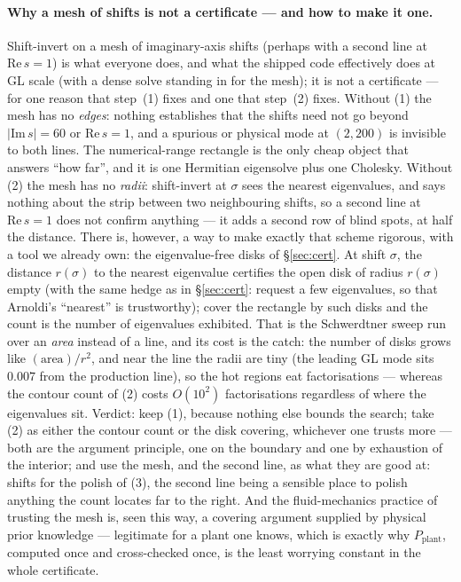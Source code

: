 \documentclass[11pt,a4paper]{article}
\begin{document}
{\paragraph{Why a mesh of shifts is not a certificate --- and how to make it one.}
Shift-invert on a mesh of imaginary-axis shifts (perhaps with a second line at
$\mathrm{Re}\,s=1$) is what everyone does, and what the shipped code effectively does at
GL scale (with a dense solve standing in for the mesh); it is not a certificate --- for
one reason that step~(1) fixes and one that step~(2) fixes.  Without (1) the mesh has no
\emph{edges}: nothing establishes that the shifts need not go beyond $|\mathrm{Im}\,s|=60$
or $\mathrm{Re}\,s=1$, and a spurious or physical mode at $(2,200)$ is invisible to both
lines.  The numerical-range rectangle is the only cheap object that answers ``how far'',
and it is one Hermitian eigensolve plus one Cholesky.  Without (2) the mesh has no
\emph{radii}: shift-invert at $\sigma$ sees the nearest eigenvalues, and says nothing
about the strip between two neighbouring shifts, so a second line at $\mathrm{Re}\,s=1$
does not confirm anything --- it adds a second row of blind spots, at half the distance.
There is, however, a way to make exactly that scheme rigorous, with a tool we already
own: the eigenvalue-free disks of \S\ref{sec:cert}.  At shift $\sigma$, the
distance $r(\sigma)$ to the nearest eigenvalue certifies the open disk of radius
$r(\sigma)$ empty (with the same hedge as in \S\ref{sec:cert}: request a few
eigenvalues, so that Arnoldi's ``nearest'' is trustworthy); cover the rectangle by such
disks and the count is the number of eigenvalues exhibited.  That is the Schwerdtner
sweep run over an \emph{area} instead of a line, and its cost is the catch: the number of
disks grows like $(\text{area})/r^2$, and near the line the radii are tiny (the leading
GL mode sits $0.007$ from the production line), so the hot regions eat factorisations ---
whereas the contour count of (2) costs $O(10^2)$ factorisations regardless of where the
eigenvalues sit.  Verdict: keep (1), because nothing else bounds the search; take (2) as
either the contour count or the disk covering, whichever one trusts more --- both are the
argument principle, one on the boundary and one by exhaustion of the interior; and use
the mesh, and the second line, as what they are good at: shifts for the polish of (3),
the second line being a sensible place to polish anything the count locates far to the
right.  And the fluid-mechanics practice of trusting the mesh is, seen this way, a
covering argument supplied by physical prior knowledge --- legitimate for a plant one
knows, which is exactly why $P_{\mathrm{plant}}$, computed once and cross-checked once,
is the least worrying constant in the whole certificate.

}
\end{document}
